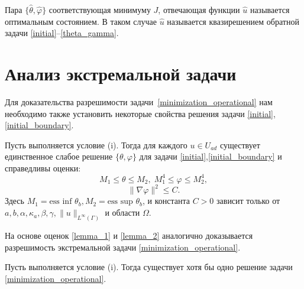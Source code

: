 \documentclass[10pt]{article}
\begin{document}
    Пара $\{\hat{\theta}, \hat{\varphi} \}$ соответствующая минимуму $J$, отвечающая функции $\hat{u}$ называется оптимальным состоянием. В таком случае $\hat{u}$ называется квазирешением обратной задачи \eqref{initial}--\eqref{theta_gamma}.

    \section{Анализ экстремальной задачи}
    \label{sec:optimality}

    Для доказательства разрешимости задачи~\eqref{minimization_operational} нам необходимо также установить некоторые свойства решения задачи \eqref{initial}, \eqref{initial_boundary}.

    \begin{lem}
        \label{SolvabilityLemma}
        Пусть выполняется условие (i). Тогда для каждого $ u \in U_{ad} $ существует единственное слабое решение $\{\theta, \varphi \}$ для задачи \eqref{initial},\eqref{initial_boundary} и справедливы оценки:
        \begin{equation}
            \label{lemma_1}
            M_1 \le \theta \le M_2, \; M_1^4 \le \varphi \le M_2^4,
        \end{equation}
        \begin{equation}
            \label{lemma_2}
            \| \nabla \varphi \|^2 \le C.
        \end{equation}
        Здесь $M_1 = \text{ess inf } \theta_b, M_2 = \text{ess sup } \theta_b$, и константа $C > 0$ зависит только от \\ $a, b, \alpha, \kappa_a, \beta, \gamma, \|u\|_{L^\infty(\Gamma)}$ и области $\Omega$.
    \end{lem}

    На основе оценок \eqref{lemma_1} и \eqref{lemma_2} аналогично \cite{cheb_origin} доказывается разрешимость экстремальной задачи \eqref{minimization_operational}.
    \begin{thm}
        Пусть выполняется условие (i). Тогда существует хотя бы одно решение задачи \eqref{minimization_operational}.
    \end{thm}
\end{document}
